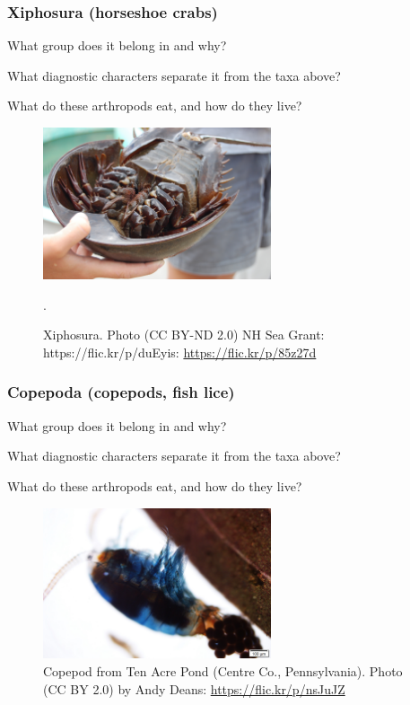 \documentclass[letterpaper, 11pt]{article}
\begin{document}
\subsubsection*{Xiphosura (horseshoe crabs)}
What group does it belong in and why?\vspace{1cm}

\noindent{}What diagnostic characters separate it from the taxa above?\vspace{1.5cm}

\noindent{}What do these arthropods eat, and how do they live?\vspace{1.5cm}

\begin{figure}[ht!]
  \centering
    \includegraphics[width=0.6\textwidth]{xipho}
  \caption{Xiphosura. Photo (CC BY-ND 2.0) NH Sea Grant: https://flic.kr/p/duEyis: \url{https://flic.kr/p/85z27d}}.
  \label{fig:xipho}
\end{figure}

\subsubsection*{Copepoda (copepods, fish lice)}
What group does it belong in and why?\vspace{1cm}

\noindent{}What diagnostic characters separate it from the taxa above?\vspace{1.5cm}

\noindent{}What do these arthropods eat, and how do they live?\vspace{1.5cm}

\begin{figure}[ht!]
  \centering
    \includegraphics[width=0.6\textwidth]{copepod}
  \caption{Copepod from Ten Acre Pond (Centre Co., Pennsylvania). Photo (CC BY 2.0) by Andy Deans: \url{https://flic.kr/p/nsJuJZ}}
  \label{fig:copepod}
\end{figure}
\end{document}
